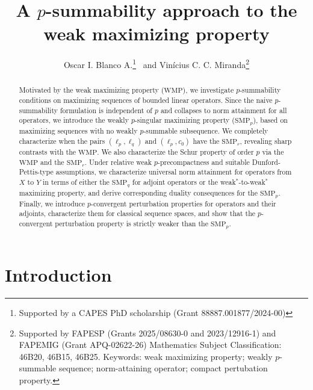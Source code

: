 \documentclass[12 pt]{article}%
\newtheorem{final remark}[theorem]{Final Remark}
\begin{document}
\title{A $p$-summability approach to the weak maximizing property}
\author{Oscar I. Blanco A.\thanks{Supported by a CAPES PhD scholarship (Grant 88887.001877/2024-00)}  \, and Vinícius C. C. Miranda\thanks{Supported by FAPESP (Grants 2025/08630-0 and 2023/12916-1) and FAPEMIG (Grant APQ-02622-26)  Mathematics Subject Classification:  46B20, 46B15, 46B25.
\newline Keywords: weak maximizing property; weakly $p$-summable sequence; norm-attaining operator; compact pertubation property.}}
\date{}
\maketitle

\begin{abstract} 
Motivated by the weak maximizing property ($\mathrm{WMP}$), we investigate $p$-summability conditions on maximizing sequences of bounded linear operators. Since the naive $p$-summability formulation is independent of $p$ and collapses to norm attainment for all operators, we introduce the weakly $p$-singular maximizing property ($\mathrm{SMP}_p$), based on maximizing sequences with no weakly $p$-summable subsequence. We completely characterize when the pairs $(\ell_p,\ell_q)$ and $(\ell_p,c_0)$ have the $\mathrm{SMP}_r$, revealing sharp contrasts with the $\mathrm{WMP}$. We also characterize the Schur property of order $p$ via the $\mathrm{WMP}$ and the $\mathrm{SMP}_r$. Under relative weak $p$-precompactness and suitable Dunford-Pettis-type assumptions, we characterize universal norm attainment for operators from $X$ to $Y$ in terms of either the $\mathrm{SMP}_q$ for adjoint operators or the
weak$^{*}$-to-weak$^{*}$ maximizing property, and derive corresponding duality consequences for the $\mathrm{SMP}_p$. Finally, we introduce
$p$-convergent perturbation properties for operators and their adjoints, characterize them for classical sequence spaces, and show that the $p$-convergent perturbation property is strictly weaker than
the $\mathrm{SMP}_p$.
\end{abstract}



\section{Introduction}
\end{document}
